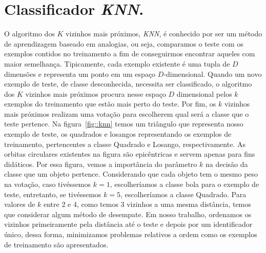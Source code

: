 
\section{Classificador \textit{KNN}.}
\label{subsec::cred_knn}


O algoritmo dos $K$ vizinhos mais próximos, \textit{KNN}, é conhecido por ser um método de aprendizagem baseado em analogias, ou seja, comparamos o teste com os exemplos contidos no treinamento a fim de conseguirmos encontrar aqueles com maior semelhança. 
Tipicamente, cada exemplo existente é uma tupla de $D$ dimensões e representa um ponto em um espaço $D$-dimensional. 
Quando um novo exemplo de teste, de classe desconhecida, necessita ser classificado, o algoritmo dos $K$ vizinhos mais próximos procura nesse espaço $D$ dimensional pelos $k$ exemplos do treinamento que estão mais perto do teste. 
Por fim, os $k$ vizinhos mais próximos realizam uma votação para escolherem qual será a classe que o teste pertence.
Na figura~\ref{fig::knn} temos um triângulo que representa nosso exemplo de teste, os quadrados e losangos representando os exemplos de treinamento, pertencentes a classe Quadrado e Losango, respectivamente. As orbitas circulares existentes na figura são epicêntricas e servem apenas para fins didáticos.
Por essa figura, vemos a importância do parâmetro $k$ na decisão da classe que um objeto pertence. Considerando que cada objeto tem o mesmo peso na votação, caso tivéssemos $k=1$, escolheríamos a classe bola para o exemplo de teste, entretanto, se tivéssemos $k=5$, escolheríamos a classe Quadrado. Para valores de $k$ entre 2 e 4, como temos 3 vizinhos a uma mesma distância, temos que considerar algum método de desempate. Em nosso trabalho, ordenamos os vizinhos primeiramente pela distância até o teste e depois por um identificador único, dessa forma, minimizamos problemas relativos a ordem como os exemplos de treinamento são apresentados.

